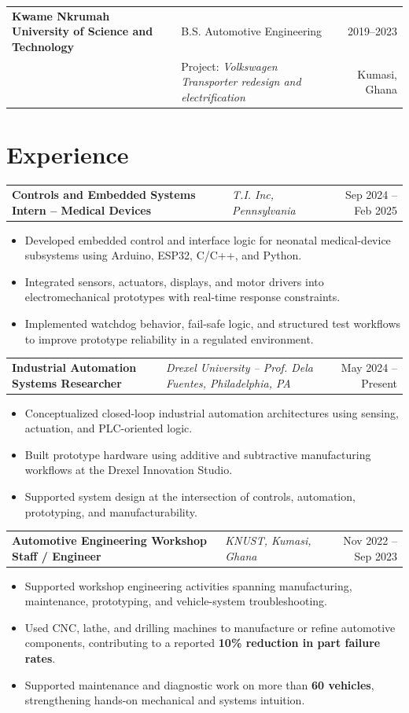 \documentclass[10pt,letterpaper]{article}
\makeatletter
\newenvironment{role}[4]
{
\begin{tabularx}{\textwidth}{@{}l Y r@{}}
\textbf{#1} & \textit{#2, #3} & #4
\end{tabularx}
\vspace{-0.45em}
\begin{itemize}[leftmargin=1.15em, itemsep=0.14em, topsep=0.15em]
}
{
\end{itemize}
\vspace{0.05em}
}
\makeatother
\begin{document}
\vspace{0.2em}

\begin{tabularx}{\textwidth}{@{}l Y r@{}}
\textbf{Kwame Nkrumah University of Science and Technology} & B.S. Automotive Engineering & 2019--2023 \\
& Project: \textit{Volkswagen Transporter redesign and electrification} & Kumasi, Ghana
\end{tabularx}

\section{Experience}

\begin{role}
{Controls and Embedded Systems Intern -- Medical Devices}
{T.I. Inc}
{Pennsylvania}
{Sep 2024 -- Feb 2025}
    \item Developed embedded control and interface logic for neonatal medical-device subsystems using Arduino, ESP32, C/C++, and Python.
    \item Integrated sensors, actuators, displays, and motor drivers into electromechanical prototypes with real-time response constraints.
    \item Implemented watchdog behavior, fail-safe logic, and structured test workflows to improve prototype reliability in a regulated environment.
\end{role}

\begin{role}
{Industrial Automation Systems Researcher}
{Drexel University -- Prof. Dela Fuentes}
{Philadelphia, PA}
{May 2024 -- Present}
    \item Conceptualized closed-loop industrial automation architectures using sensing, actuation, and PLC-oriented logic.
    \item Built prototype hardware using additive and subtractive manufacturing workflows at the Drexel Innovation Studio.
    \item Supported system design at the intersection of controls, automation, prototyping, and manufacturability.
\end{role}

\begin{role}
{Automotive Engineering Workshop Staff / Engineer}
{KNUST}
{Kumasi, Ghana}
{Nov 2022 -- Sep 2023}
    \item Supported workshop engineering activities spanning manufacturing, maintenance, prototyping, and vehicle-system troubleshooting.
    \item Used CNC, lathe, and drilling machines to manufacture or refine automotive components, contributing to a reported \textbf{10\% reduction in part failure rates}.
    \item Supported maintenance and diagnostic work on more than \textbf{60 vehicles}, strengthening hands-on mechanical and systems intuition.
\end{role}
\end{document}
